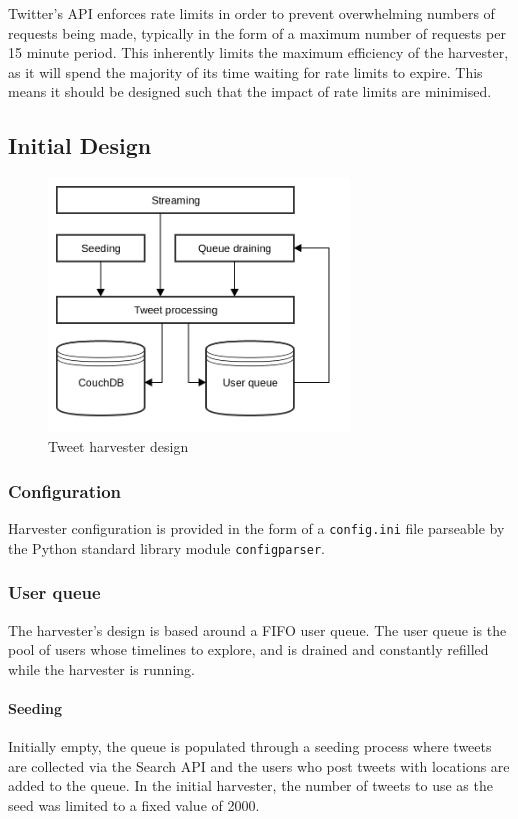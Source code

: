 Twitter's API enforces rate limits in order to prevent overwhelming numbers of requests being made, typically in the form of a maximum number of requests per 15 minute period. This inherently limits the maximum efficiency of the harvester, as it will spend the majority of its time waiting for rate limits to expire. This means it should be designed such that the impact of rate limits are minimised.

\subsection{Initial Design}

\begin{figure}[H]
    \centering
    \includegraphics[width=8cm,keepaspectratio=true]{images/harvester.png}
    \caption{Tweet harvester design}
    \label{fig:harvesterinitdesign}
\end{figure}

\subsubsection{Configuration}

Harvester configuration is provided in the form of a \texttt{config.ini} file parseable by the Python standard library module \texttt{configparser}.

\subsubsection{User queue}

The harvester's design is based around a FIFO user queue. The user queue is the pool of users whose timelines to explore, and is drained and constantly refilled while the harvester is running.

\paragraph{Seeding}
Initially empty, the queue is populated through a seeding process where tweets are collected via the Search API and the users who post tweets with locations are added to the queue. In the initial harvester, the number of tweets to use as the seed was limited to a fixed value of 2000.

